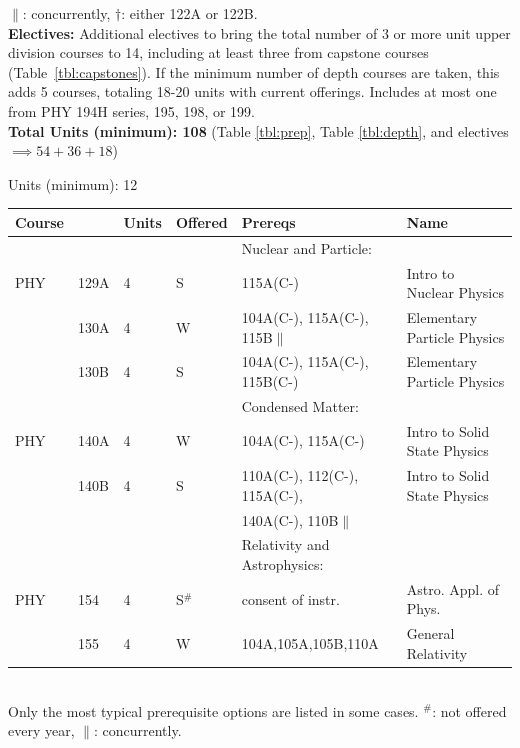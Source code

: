\documentclass[12pt]{article}
\begin{document}
\noindent
$\parallel$: concurrently, $\dagger$: either 122A or 122B.\\[5pt]
\noindent
{\bf Electives:} Additional electives to bring the total number of 3
or more unit upper division courses to 14, including at least three
from capstone courses (Table~\ref{tbl:capstones}).  If the minimum number of depth courses are
taken, this adds 5 courses, totaling 18-20 units with current offerings.  Includes at most one from PHY 194H series, 195, 198, or 199.\\[5pt]
\noindent
{\bf Total Units (minimum): 108} (Table \ref{tbl:prep}, Table \ref{tbl:depth}, and electives $\implies 54+36+18$)

\newpage
{}
\label{tbl:capstones}
\noindent
Units (minimum):  12\\
\begin{tabular}{|llllll|}
\hline
Course & & Units & Offered & Prereqs & Name \\
\hline
    & & & & Nuclear and Particle: & \\
\hline
PHY & 129A  & 4 & S & 115A(C-) & Intro to Nuclear Physics \\
    & 130A  & 4 & W & 104A(C-), 115A(C-), 115B$\parallel$ & Elementary Particle Physics \\
    & 130B  & 4 & S & 104A(C-), 115A(C-), 115B(C-) & Elementary Particle Physics \\
\hline
& & & & Condensed Matter: & \\
\hline
PHY & 140A  & 4 & W & 104A(C-), 115A(C-) & Intro to Solid State Physics \\
    & 140B  & 4 & S & 110A(C-), 112(C-), 115A(C-), & Intro to Solid State Physics\\
    &       &   &   & 140A(C-), 110B$\parallel$    & \\
\hline
& & & & Relativity and Astrophysics: & \\
\hline
PHY & 154   & 4 & S$^\#$ & consent of instr. & Astro. Appl. of Phys. \\
    & 155   & 4 & W      & 104A,105A,105B,110A & General Relativity \\ 
\hline
\end{tabular}\\
Only the most typical prerequisite options are listed in some cases.
$^\#$: not offered every year, $\parallel$: concurrently.\\
\end{document}
